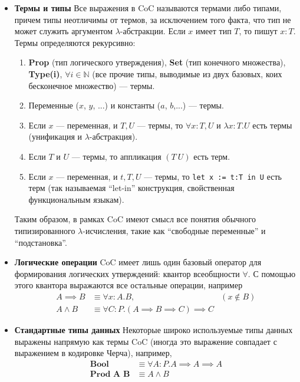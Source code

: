 \begin{itemize}
\item \textbf{Термы и типы} Все выражения в CoC называются термами либо типами, причем типы неотличимы от термов, за исключением того факта, что тип не может служить аргументом $\lambda$-абстракции. Если $x$ имеет тип $T$, то пишут $x:T$. Термы определяются рекурсивно:
\begin{enumerate}
\item \textbf{Prop} (тип логического утверждения), \textbf{Set} (тип конечного множества), \textbf{Type(i)}, $\forall i \in \mathbb{N}$ (все прочие типы, выводимые из двух базовых, коих бесконечное множество) --- термы.
\item Переменные ($x$, $y$, ...) и константы ($a$, $b$,...) --- термы.
\item Если $x$ --- переменная, и $T, U$ --- термы, то $\forall x : T, U$ и $\lambda x : T. U$ есть термы (унификация и $\lambda$-абстракция).
\item Если $T$ и $U$ --- термы, то аппликация $(T\ U)$ есть терм.
\item Если $x$ --- переменная, и $t, T, U$ --- термы, то \texttt{let x := t:T in U} есть терм (так называемая ``let-in'' конструкция, свойственная функциональным языкам).
\end{enumerate}
Таким образом, в рамках CoC имеют смысл все понятия обычного типизированного $\lambda$-исчисления, такие как ``свободные переменные'' и ``подстановка''.

\item \textbf{Логические операции} CoC имеет лишь один базовый оператор для формирования логических утверждений: квантор всеобщности $\forall$. С помощью этого квантора выражаются все остальные операции, например
\begin{align*}
A \implies B &\equiv \forall x: A.B, & (x \notin B) \\
A \wedge B &\equiv \forall C : P.(A \implies B \implies C) \implies C &
\end{align*}
\item \textbf{Стандартные типы данных} Некоторые широко используемые типы данных выражены напрямую как термы CoC (иногда это выражение совпадает с выражением в кодировке Черча), например,
\begin{align*}
\textbf{Bool} & \equiv \forall A:P.A \implies A \implies A \\
\textbf{Prod A B} & \equiv A \wedge B
\end{align*}
\end{itemize}

